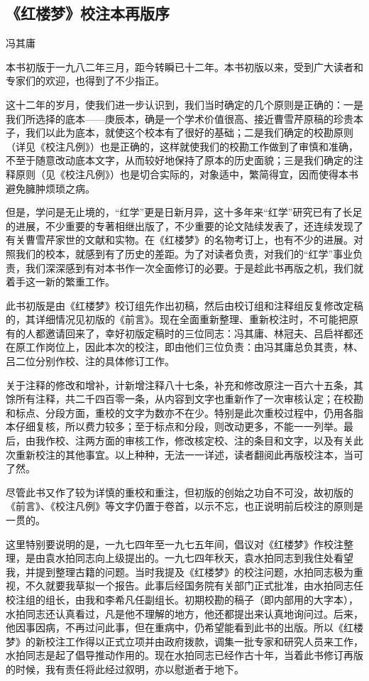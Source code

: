 \subsection*{《红楼梦》校注本再版序}
\begin{center}
    \par 冯其庸
\end{center}
\par 本书初版于一九八二年三月，距今转瞬已十二年。本书初版以来，受到广大读者和专家们的欢迎，也得到了不少指正。
\par 这十二年的岁月，使我们进一步认识到，我们当时确定的几个原则是正确的：一是我们所选择的底本——庚辰本，确是一个学术价值很高、接近曹雪芹原稿的珍贵本子，我们以此为底本，就使这个校本有了很好的基础；二是我们确定的校勘原则（详见《校注凡例》）也是正确的，这样就使我们的校勘工作做到了审慎和准确，不至于随意改动底本文字，从而较好地保持了原本的历史面貌；三是我们确定的注释原则（见《校注凡例》）也是切合实际的，对象适中，繁简得宜，因而使得本书避免臃肿烦琐之病。
\par 但是，学问是无止境的，“红学”更是日新月异，这十多年来“红学”研究已有了长足的进展，不少重要的专著相继出版了，不少重要的论文陆续发表了，还连续发现了有关曹雪芹家世的文献和实物。在《红楼梦》的名物考订上，也有不少的进展。对照我们的校本，就感到有了历史的差距。为了对读者负责，对我们的“红学”事业负责，我们深深感到有对本书作一次全面修订的必要。于是趁此书再版之机，我们就着手这一新的繁重工作。
\par 此书初版是由《红楼梦》校订组先作出初稿，然后由校订组和注释组反复修改定稿的，其详细情况见初版的《前言》。现在全面重新整理、重新校注时，不可能把原有的人都邀请回来了，幸好初版定稿时的三位同志：冯其庸、林冠夫、吕启祥都还在原工作岗位上，因此本次的校注，即由他们三位负责：由冯其庸总负其责，林、吕二位分别作校、注的具体修订工作。
\par 关于注释的修改和增补，计新增注释八十七条，补充和修改原注一百六十五条，其馀所有注释，共二千四百零一条，从内容到文字也重新作了一次审核认定；在校勘和标点、分段方面，重校的文字为数亦不在少。特别是此次重校过程中，仍用各脂本仔细复核，所以费力较多；至于标点和分段，则改动更多，不能一一列举。最后，由我作校、注两方面的审核工作，修改核定校、注的条目和文字，以及有关此次重新校注的其他事宜。以上种种，无法一一详述，读者翻阅此再版校注本，当可了然。
\par 尽管此书又作了较为详慎的重校和重注，但初版的创始之功自不可没，故初版的《前言》、《校注凡例》等文字仍置于卷首，以示不忘，也正说明前后校注的原则是一贯的。
\par 这里特别要说明的是，一九七四年至一九七五年间，倡议对《红楼梦》作校注整理，是由袁水拍同志向上级提出的。一九七四年秋天，袁水拍同志到我住处看望我，并提到整理古籍的问题。当时我提及《红楼梦》的校注问题，水拍同志极为重视，不久就要我草拟一个报告。此事后经国务院有关部门正式批准，由水拍同志任校注组的组长，由我和李希凡任副组长。初期校勘的稿子（即内部用的大字本），水拍同志还认真看过，凡是他不理解的地方，他还都提出来认真地询问过。后来，他因事因病，不再过问此事，但在重病中，仍希望能看到此书的出版。所以《红楼梦》的新校注工作得以正式立项并由政府拨款，调集一批专家和研究人员来工作，水拍同志是起了倡导推动作用的。现在水拍同志已经作古十年，当着此书修订再版的时候，我有责任将此经过叙明，亦以慰逝者于地下。
